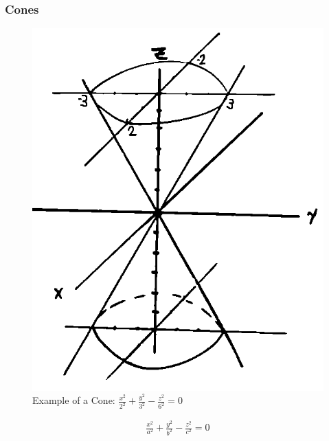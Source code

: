 \documentclass{article}
\begin{document}
\subsubsection{Cones}
\begin{figure}[h]
  \includegraphics[scale=0.5]{cone}
  \centering
  \caption{Example of a Cone: $\frac{x^2}{2^2} + \frac{y^2}{3^2} - \frac{z^2}{6^2} = 0$}
  \label{fig:cone}
\end{figure}
\begin{align}
  \frac{x^2}{a^2} + \frac{y^2}{b^2} - \frac{z^2}{c^2} = 0
\end{align}
\end{document}
